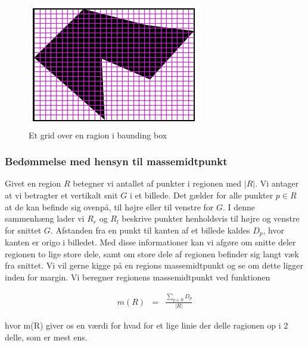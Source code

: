 {\begin{figure}[h]
	\centering
	\includegraphics[scale=0.76,angle=0]{afsnit/vores_implementation/billeder/udvidet_loesning/udvidetloesninglayer.png}
	\caption[]{Et grid over en ragion i baunding box}
	\label{grid}
\end{figure}

\subsubsection{Bedømmelse med hensyn til massemidtpunkt}
Givet en region $R$ betegner vi antallet af punkter i regionen med
$|R|$. Vi antager at vi betragter et vertikalt snit $G$ i et billede.
Det gælder for alle punkter $p \in R$ at de kan befinde sig ovenpå, til
højre eller til venstre for $G$. I denne sammenhæng lader vi $R_r$ og
$R_l$ beskrive punkter henholdsvis til højre og venstre for snittet $G$.
Afstanden fra en punkt til kanten af et billede kaldes $D_p$, hvor
kanten er origo i billedet. Med disse informationer kan vi afgøre om
snitte deler regionen to lige store dele, samt om store dele af regionen
befinder sig langt væk fra snittet. Vi vil gerne kigge på en regions
massemidtpunkt og se om dette ligger inden for margin. Vi beregner
regionens massemidtpunkt ved funktionen


\begin{eqnarray}
    m(R) & = & \frac{\sum_{p \in R}{D_p}}{|R|} \label{masssemidpunkt}
    \label{MPunkt}
\end{eqnarray}

hvor m(R) giver os en værdi for hvad for et lige linie der delle ragionen
op i 2 delle, som er mest ens.

}
